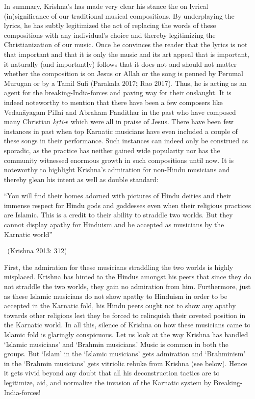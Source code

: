 {In summary, Krishna’s has made very clear his stance the on lyrical (in)significance of our traditional musical compositions. By underplaying the lyrics, he has subtly legitimized the act of replacing the words of these compositions with any individual’s choice and thereby legitimizing the Christianization of our music. Once he convinces the reader that the lyrics is not that important and that it is only the music and its art appeal that is important, it naturally (and importantly) follows that it does not and should not matter whether the composition is on Jesus or Allah or the song is penned by Perumal Murugan or by a Tamil Sufi (Parakala 2017\textbf{; }Rao 2017). Thus, he is acting as an agent for the breaking-India-forces and paving way for their onslaught. It is indeed noteworthy to mention that there have been a few composers like Vedanāyagam Pillai and Abraham Pandithar in the past who have composed many Christian \textit{kṛti-}s which were all in praise of Jesus. There have been few instances in past when top Karnatic musicians have even included a couple of these songs in their performance. Such instances can indeed only be construed as sporadic, as the practice has neither gained wide popularity nor has the community witnessed enormous growth in such compositions until now. It is noteworthy to highlight Krishna’s admiration for non-Hindu musicians and thereby glean his intent as well as double standard:

\begin{myquote}
“You will find their homes adorned with pictures of Hindu deities and their immense respect for Hindu gods and goddesses even when their religious practices are Islamic. This is a credit to their ability to straddle two worlds. But they cannot display apathy for Hinduism and be accepted as musicians by the Karnatic world” 

~\hfill (Krishna 2013: 312)
\end{myquote}

First, the admiration for these musicians straddling the two worlds is highly misplaced. Krishna has hinted to the Hindus amongst his peers that since they do not straddle the two worlds, they gain no admiration from him. Furthermore, just as these Islamic musicians do not show apathy to Hinduism in order to be accepted in the Karnatic fold, his Hindu peers ought not to show any apathy towards other religions lest they be forced to relinquish their coveted position in the Karnatic world. In all this, silence of Krishna on how these musicians came to Islamic fold is glaringly conspicuous. Let us look at the way Krishna has handled ‘Islamic musicians’ and ‘Brahmin musicians.’ Music is common in both the groups. But ‘Islam’ in the ‘Islamic musicians’ gets admiration and ‘Brahminism’ in the ‘Brahmin musicians’ gets vitriolic rebuke from Krishna (see below). Hence it gets vivid beyond any doubt that all his deconstruction tactics are to legitimize, aid, and normalize the invasion of the Karnatic system by Breaking-India-forces!

}
